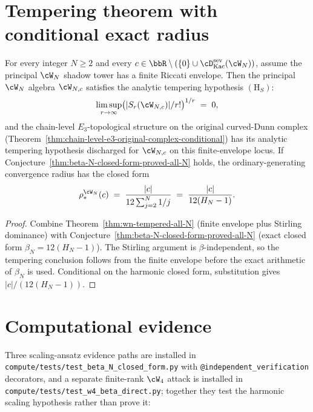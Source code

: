 \section{Tempering theorem with conditional exact radius}
\label{sec:tempering-theorem-healed}

\begin{theorem}
\label{thm:wn-tempered-exact-radius}
\ClaimStatusConditional
For every integer $N \ge 2$ and every $c \in \bbR \setminus (\{0\} \cup
\cD^{\mathrm{sev}}_{\mathrm{Kac}}(\cW_N))$, assume the principal
$\cW_N$ shadow tower has a finite Riccati envelope. Then the principal
$\cW_N$ algebra $\cW_{N,c}$ satisfies the analytic tempering hypothesis
$(\mathrm{H}_S)$:
\[
 \limsup_{r \to \infty}
 \bigl( \lvert S_r(\cW_{N,c}) \rvert / r! \bigr)^{1/r}
 \;=\;
 0,
\]
and the chain-level $E_3$-topological structure on the original
curved-Dunn complex
(Theorem~\ref{thm:chain-level-e3-original-complex-conditional}) has
its analytic tempering hypothesis discharged for $\cW_{N,c}$ on this
finite-envelope locus. If Conjecture~\ref{thm:beta-N-closed-form-proved-all-N}
holds, the ordinary-generating convergence radius has the closed form
\[
 \rho_*^{\cW_N}(c)
 \;=\;
 \frac{|c|}{12 \sum_{j=2}^{N} 1/j}
 \;=\;
 \frac{|c|}{12(H_N - 1)}.
\]
\end{theorem}

\begin{proof}
Combine Theorem~\ref{thm:wn-tempered-all-N} (finite envelope plus
Stirling dominance) with Conjecture~\ref{thm:beta-N-closed-form-proved-all-N}
(exact closed form $\beta_N = 12(H_N - 1)$). The Stirling argument is
$\beta$-independent, so the tempering conclusion follows from the finite
envelope before the exact arithmetic of $\beta_N$ is used. Conditional
on the harmonic closed form, substitution gives $|c|/(12(H_N - 1))$.
\end{proof}

\section{Computational evidence}
\label{sec:beta-N-independent-verification}

Three scaling-ansatz evidence paths are installed in
\texttt{compute/tests/test\_beta\_N\_closed\_form.py} with
\texttt{@independent\_verification} decorators, and a separate
finite-rank $\cW_4$ attack is installed in
\texttt{compute/tests/test\_w4\_beta\_direct.py}; together they test
the harmonic scaling hypothesis rather than prove it:

